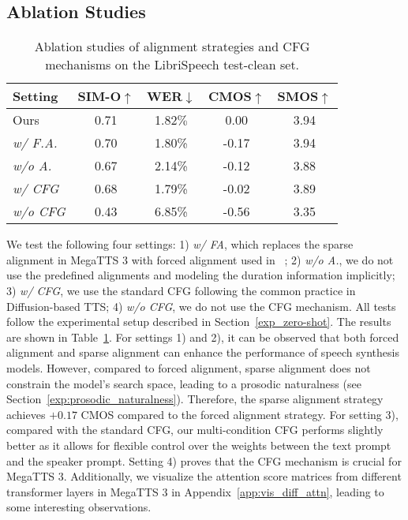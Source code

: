 \subsection{Ablation Studies}
\label{exp:ablation_studies}
\begin{table}[!t]
\small
\centering
\begin{tabular}{@{}l|cc|cc@{}}
\toprule
\bfseries Setting & \bfseries SIM-O$\uparrow$ & \bfseries WER$\downarrow$ & \bfseries CMOS$\uparrow$ & \bfseries SMOS$\uparrow$ \\       
\midrule
Ours & 0.71 & 1.82$\%$ & 0.00 & 3.94 \\
\midrule
\textit{w/ F.A.}  & 0.70 & 1.80\% & -0.17 & 3.94 \\
\textit{w/o A.}        & 0.67 & 2.14\% & -0.12 & 3.88 \\
\midrule
\textit{w/ CFG}       & 0.68 & 1.79\% & -0.02 & 3.89 \\
\textit{w/o CFG}              & 0.43 & 6.85\% & -0.56 & 3.35  \\
\bottomrule
\end{tabular}
\caption{Ablation studies of alignment strategies and CFG mechanisms on the LibriSpeech test-clean set.}
\label{table:ablation_alignments_cfg}
\end{table}

We test the following four settings: 1) \textit{w/ FA}, which replaces the sparse alignment in MegaTTS 3 with forced alignment used in ~\citep{le2023Voicebox,shen2023naturalspeech}; 2) \textit{w/o A.}, we do not use the predefined alignments and modeling the duration information implicitly; 3) \textit{w/ CFG}, we use the standard CFG following the common practice in Diffusion-based TTS; 4) \textit{w/o CFG}, we do not use the CFG mechanism. All tests follow the experimental setup described in Section~\ref{exp_zero-shot}. The results are shown in Table~\ref{table:ablation_alignments_cfg}. For settings 1) and 2), it can be observed that both forced alignment and sparse alignment can enhance the performance of speech synthesis models. However, compared to forced alignment, sparse alignment does not constrain the model's search space, leading to a prosodic naturalness (see Section~\ref{exp:prosodic_naturalness}). Therefore, the sparse alignment strategy achieves $+0.17$ CMOS compared to the forced alignment strategy. For setting 3), compared with the standard CFG, our multi-condition CFG performs slightly better as it allows for flexible control over the weights between the text prompt and the speaker prompt. Setting 4) proves that the CFG mechanism is crucial for MegaTTS 3. Additionally, we visualize the attention score matrices from different transformer layers in MegaTTS 3 in Appendix~\ref{app:vis_diff_attn}, leading to some interesting observations.



